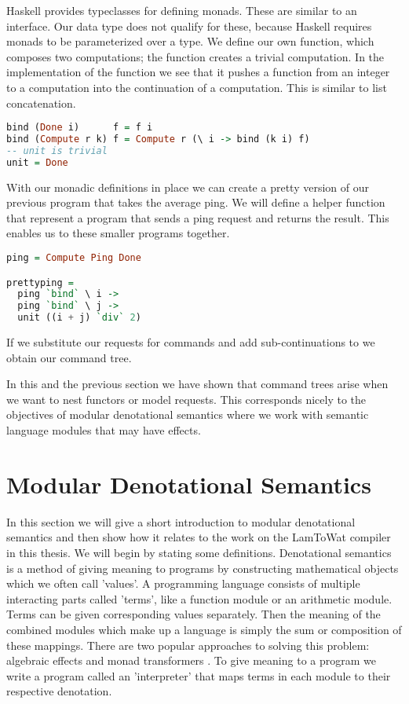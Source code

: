 Haskell provides typeclasses for defining monads. These are similar to an interface. Our  data type does not qualify for these, because Haskell requires monads to be parameterized over a type. We define our own  function, which composes two computations; the  function creates a trivial computation. In the implementation of the  function we see that it pushes a function from an integer to a computation into the continuation of a computation. This is similar to list concatenation.

\begin{lstlisting}[language=Haskell]
bind (Done i)      f = f i
bind (Compute r k) f = Compute r (\ i -> bind (k i) f)
-- unit is trivial
unit = Done
\end{lstlisting}

With our monadic definitions in place we can create a pretty version of our previous program that takes the average ping. We will define a helper function that represent a program that sends a ping request and returns the result. This enables us to  these smaller programs together.

\begin{lstlisting}[language=Haskell]
ping = Compute Ping Done

prettyping =
  ping `bind` \ i ->
  ping `bind` \ j ->
  unit ((i + j) `div` 2)
\end{lstlisting}

If we substitute our requests for commands and add sub-continuations to  we obtain our command tree. 

In this and the previous section we have shown that command trees arise when we want to nest functors or model requests. This corresponds nicely to the objectives of modular denotational semantics where we work with semantic language modules that may have effects.

\section{\label{section:denotationalsemantics}Modular Denotational Semantics}
In this section we will give a short introduction to modular denotational semantics and then show how it relates to the work on the LamToWat compiler in this thesis. We will begin by stating some definitions. Denotational semantics is a method of giving meaning to programs by constructing mathematical objects which we often call 'values'. A programming language consists of multiple interacting parts called 'terms', like a function module or an arithmetic module. Terms can be given corresponding values separately. Then the meaning of the combined modules which make up a language is simply the sum or composition of these mappings. There are two popular approaches to solving this problem: algebraic effects \cite{DBLP:conf/tacs/CartwrightF94} and monad transformers \cite{DBLP:conf/popl/LiangHJ95}. To give meaning to a program we write a program called an 'interpreter' that maps terms in each module to their respective denotation.

